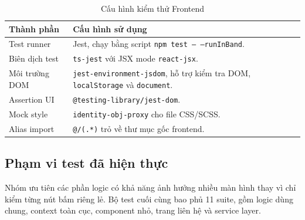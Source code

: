 \begin{table}[H]
\centering
\small
\begin{tabularx}{\textwidth}{|p{3.5cm}|X|}
\hline
\textbf{Thành phần} & \textbf{Cấu hình sử dụng} \\
\hline
Test runner & Jest, chạy bằng script \texttt{npm test -- --runInBand}. \\
\hline
Biên dịch test & \texttt{ts-jest} với JSX mode \texttt{react-jsx}. \\
\hline
Môi trường DOM & \texttt{jest-environment-jsdom}, hỗ trợ kiểm tra DOM, \texttt{localStorage} và \texttt{document}. \\
\hline
Assertion UI & \texttt{@testing-library/jest-dom}. \\
\hline
Mock style & \texttt{identity-obj-proxy} cho file CSS/SCSS. \\
\hline
Alias import & \texttt{@/(.*)} trỏ về thư mục gốc frontend. \\
\hline
\end{tabularx}
\caption{Cấu hình kiểm thử Frontend}
\label{tab:fe_test_env}
\end{table}


\subsection{Phạm vi test đã hiện thực}

Nhóm ưu tiên các phần logic có khả năng ảnh hưởng nhiều màn hình thay vì chỉ
kiểm từng nút bấm riêng lẻ. Bộ test cuối cùng bao phủ 11 suite, gồm logic dùng
chung, context toàn cục, component nhỏ, trang liên hệ và service layer.

